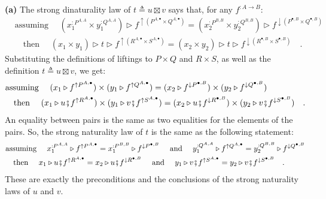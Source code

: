 \textbf{(a)} The strong dinaturality law of $t\triangleq u\boxtimes v$
says that, for any $f^{:A\rightarrow B}$:
\begin{align*}
 & \text{assuming }\quad(x_{1}^{:P^{A,A}}\times y_{1}^{:Q^{A,A}})\triangleright f^{\uparrow(P^{A,\bullet}\times Q^{A,\bullet})}=(x_{2}^{:P^{B,B}}\times y_{2}^{:Q^{B,B}})\triangleright f^{\downarrow(P^{\bullet,B}\times Q^{\bullet,B})}\\
 & \quad\text{then }\quad(x_{1}\times y_{1})\triangleright t\triangleright f^{\uparrow(R^{A,\bullet}\times S^{A,\bullet})}=(x_{2}\times y_{2})\triangleright t\triangleright f^{\downarrow(R^{\bullet,B}\times S^{\bullet,B})}\quad.
\end{align*}
Substituting the definitions of liftings to $P\times Q$ and $R\times S$,
as well as the definition $t\triangleq u\boxtimes v$, we get:
\begin{align*}
 & \text{assuming }\quad(x_{1}\triangleright f^{\uparrow P^{A,\bullet}})\times(y_{1}\triangleright f^{\uparrow Q^{A,\bullet}})=(x_{2}\triangleright f^{\downarrow P^{\bullet,B}})\times(y_{2}\triangleright f^{\downarrow Q^{\bullet,B}})\\
 & \quad\text{then }\quad(x_{1}\triangleright u\bef f^{\uparrow R^{A,\bullet}})\times(y_{1}\triangleright v\bef f^{\uparrow S^{A,\bullet}})=(x_{2}\triangleright u\bef f^{\downarrow R^{\bullet,B}})\times(y_{2}\triangleright v\bef f^{\downarrow S^{\bullet,B}})\quad.
\end{align*}
An equality between pairs is the same as two equalities for the elements
of the pairs. So, the strong naturality law of $t$ is the same as
the following statement:
\begin{align*}
 & \text{assuming }\quad x_{1}^{:P^{A,A}}\triangleright f^{\uparrow P^{A,\bullet}}=x_{1}^{:P^{B,B}}\triangleright f^{\downarrow P^{\bullet,B}}\quad\text{ and }\quad y_{1}^{:Q^{A,A}}\triangleright f^{\uparrow Q^{A,\bullet}}=y_{2}^{:Q^{B,B}}\triangleright f^{\downarrow Q^{\bullet,B}}\\
 & \quad\text{then }\quad x_{1}\triangleright u\bef f^{\uparrow R^{A,\bullet}}=x_{2}\triangleright u\bef f^{\downarrow R^{\bullet,B}}\quad\text{ and }\quad y_{1}\triangleright v\bef f^{\uparrow S^{A,\bullet}}=y_{2}\triangleright v\bef f^{\downarrow S^{\bullet,B}}\quad.
\end{align*}
These are exactly the preconditions and the conclusions of the strong
naturality laws of $u$ and $v$.

